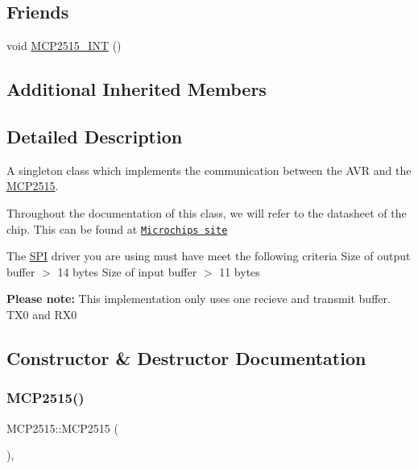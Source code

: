 \subsection*{Friends}
\begin{DoxyCompactItemize}
\item 
void \hyperlink{class_m_c_p2515_a3e97befdad3bb95f1da9cf6ff507febe}{M\+C\+P2515\+\_\+\+I\+NT} ()
\end{DoxyCompactItemize}
\subsection*{Additional Inherited Members}


\subsection{Detailed Description}
A singleton class which implements the communication between the A\+VR and the \hyperlink{class_m_c_p2515}{M\+C\+P2515}. 

Throughout the documentation of this class, we will refer to the datasheet of the chip. This can be found at \href{http://ww1.microchip.com/downloads/en/DeviceDoc/21801G.pdf}{\tt Microchips site}

The \hyperlink{namespace_s_p_i}{S\+PI} driver you are using must have meet the following criteria Size of output buffer $>$ 14 bytes  Size of input buffer $>$ 11 bytes 

{\bfseries Please note\+:} This implementation only uses one recieve and transmit buffer. T\+X0 and R\+X0 

\subsection{Constructor \& Destructor Documentation}
\hypertarget{class_m_c_p2515_aa30177fa790741310b4453a62f8d724b}{}\label{class_m_c_p2515_aa30177fa790741310b4453a62f8d724b} 
\subsubsection{\texorpdfstring{M\+C\+P2515()}{MCP2515()}\hspace{0.1cm}{\footnotesize\ttfamily [1/2]}}
{\footnotesize\ttfamily M\+C\+P2515\+::\+M\+C\+P2515 (\begin{DoxyParamCaption}{ }\end{DoxyParamCaption})\hspace{0.3cm}{\ttfamily [inline]}, {\ttfamily [private]}}


